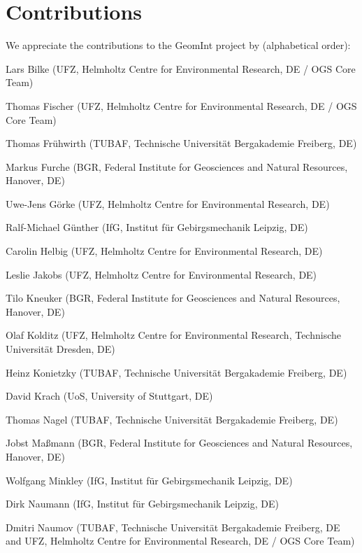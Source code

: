 \chapter*{Contributions}

We appreciate the contributions to the GeomInt project by (alphabetical order):

\begin{list}{-}{\leftmargin=1em \itemindent=0em \itemsep=0.1em}
\item Lars Bilke (UFZ, Helmholtz Centre for Environmental Research, DE / OGS Core Team)	
\item Thomas Fischer (UFZ, Helmholtz Centre for Environmental Research, DE / OGS Core Team)	
\item Thomas Fr\"uhwirth (TUBAF, Technische Universit\"at Bergakademie Freiberg, DE)	
\item Markus Furche (BGR, Federal Institute for Geosciences and Natural Resources, Hanover, DE)
\item Uwe-Jens G\"orke (UFZ, Helmholtz Centre for Environmental Research, DE)	
\item Ralf-Michael Günther (IfG, Institut für Gebirgsmechanik Leipzig, DE)	
\item Carolin Helbig (UFZ, Helmholtz Centre for Environmental Research, DE)	
\item Leslie Jakobs (UFZ, Helmholtz Centre for Environmental Research, DE)
\item Tilo Kneuker (BGR, Federal Institute for Geosciences and Natural Resources, Hanover, DE)
\item Olaf Kolditz (UFZ, Helmholtz Centre for Environmental Research, Technische Universit\"at Dresden, DE) 
\item Heinz Konietzky (TUBAF, Technische Universit\"at Bergakademie Freiberg, DE)	
\item David Krach (UoS, University of Stuttgart, DE)	
\item Thomas Nagel (TUBAF, Technische Universit\"at Bergakademie Freiberg, DE) 
\item Jobst Ma{\ss}mann (BGR, Federal Institute for Geosciences and Natural Resources, Hanover, DE)
\item Wolfgang Minkley (IfG, Institut für Gebirgsmechanik Leipzig, DE)	
\item Dirk Naumann (IfG, Institut für Gebirgsmechanik Leipzig, DE)	
\item Dmitri Naumov (TUBAF, Technische Universit\"at Bergakademie Freiberg, DE and UFZ, Helmholtz Centre for Environmental Research, DE / OGS Core Team)	

\end{list}
